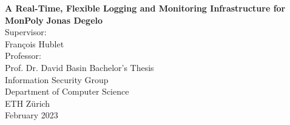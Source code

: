 \begin{titlepage}
    \begin{center}
        \vspace*{1cm}
        \Huge
        \textbf{A Real-Time, Flexible Logging and Monitoring Infrastructure for MonPoly}
        \vspace{0.5cm}
        \LARGE
        \vspace{1.5cm}
        \textbf{Jonas Degelo} \\
        \vspace{1.5cm}
        Supervisor: \\
        François Hublet \\

        Professor: \\
        Prof. Dr. David Basin
        \vfill
        Bachelor's Thesis \\
        \vspace{0.8cm}
        \Large
        Information Security Group\\
        Department of Computer Science\\
        ETH Zürich\\
        February 2023
    \end{center}
\end{titlepage}